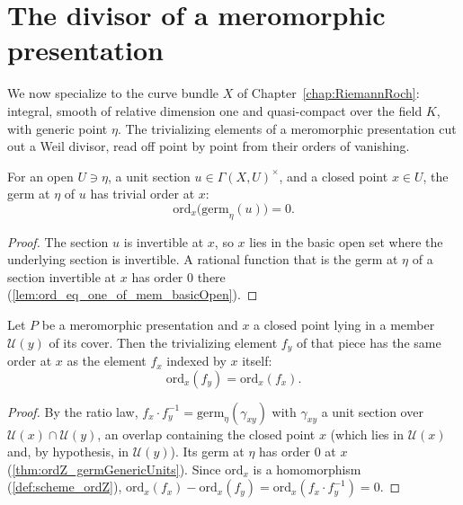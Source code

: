 \section{The divisor of a meromorphic presentation}

We now specialize to the curve bundle \(X\) of Chapter~\ref{chap:RiemannRoch}: integral, smooth of
relative dimension one and quasi-compact over the field \(K\), with generic point \(\eta\). The
trivializing elements of a meromorphic presentation cut out a Weil divisor, read off point by
point from their orders of vanishing.

\begin{theorem}
  \label{thm:ordZ_germGenericUnits}
  \leanok
  For an open \(U \ni \eta\), a unit section \(u \in \Gamma(X,U)^{\times}\), and a closed point
  \(x \in U\), the germ at \(\eta\) of \(u\) has trivial order at \(x\):
  \[
    \mathrm{ord}_x\bigl(\mathrm{germ}_\eta(u)\bigr) = 0.
  \]
\end{theorem}
\begin{proof}
  \leanok
  The section \(u\) is invertible at \(x\), so \(x\) lies in the basic open set where the
  underlying section is invertible. A rational function that is the germ at \(\eta\) of a section
  invertible at \(x\) has order \(0\) there (\ref{lem:ord_eq_one_of_mem_basicOpen}).
\end{proof}

\begin{theorem}
  \label{thm:ordZ_elem_eq}
  \leanok
  Let \(P\) be a meromorphic presentation and \(x\) a closed point lying in a member
  \(\mathcal U(y)\) of its cover. Then the trivializing element \(f_y\) of that piece has the same
  order at \(x\) as the element \(f_x\) indexed by \(x\) itself:
  \[
    \mathrm{ord}_x(f_y) = \mathrm{ord}_x(f_x).
  \]
\end{theorem}
\begin{proof}
  \leanok
  By the ratio law, \(f_x \cdot f_y^{-1} = \mathrm{germ}_\eta(\gamma_{xy})\) with \(\gamma_{xy}\) a
  unit section over \(\mathcal U(x) \cap \mathcal U(y)\), an overlap containing the closed point
  \(x\) (which lies in \(\mathcal U(x)\) and, by hypothesis, in \(\mathcal U(y)\)). Its germ at
  \(\eta\) has order \(0\) at \(x\) (\ref{thm:ordZ_germGenericUnits}). Since \(\mathrm{ord}_x\) is a
  homomorphism (\ref{def:scheme_ordZ}), \(\mathrm{ord}_x(f_x) - \mathrm{ord}_x(f_y) =
  \mathrm{ord}_x(f_x \cdot f_y^{-1}) = 0\).
\end{proof}

